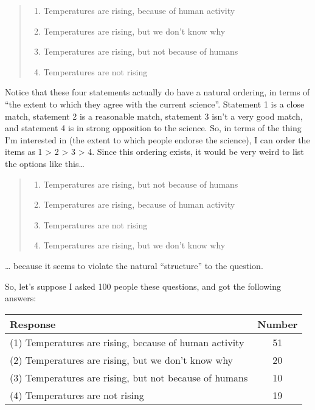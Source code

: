 \documentclass[]{book}
\providecommand{\tightlist}{%
  \setlength{\itemsep}{0pt}\setlength{\parskip}{0pt}}
\begin{document}
\begin{quote}
\begin{enumerate}
\def\labelenumi{(\arabic{enumi})}
\tightlist
\item
  Temperatures are rising, because of human activity
\item
  Temperatures are rising, but we don't know why
\item
  Temperatures are rising, but not because of humans
\item
  Temperatures are not rising
\end{enumerate}
\end{quote}

Notice that these four statements actually do have a natural ordering, in terms of ``the extent to which they agree with the current science''. Statement 1 is a close match, statement 2 is a reasonable match, statement 3 isn't a very good match, and statement 4 is in strong opposition to the science. So, in terms of the thing I'm interested in (the extent to which people endorse the science), I can order the items as 1 \textgreater{} 2 \textgreater{} 3 \textgreater{} 4. Since this ordering exists, it would be very weird to list the options like this\ldots{}

\begin{quote}
\begin{enumerate}
\def\labelenumi{(\arabic{enumi})}
\setcounter{enumi}{2}
\tightlist
\item
  Temperatures are rising, but not because of humans
\item
  Temperatures are rising, because of human activity
\item
  Temperatures are not rising
\item
  Temperatures are rising, but we don't know why
\end{enumerate}
\end{quote}

\ldots{} because it seems to violate the natural ``structure'' to the question.

So, let's suppose I asked 100 people these questions, and got the following answers:

\begin{longtable}[]{@{}lc@{}}
\toprule
Response & Number\tabularnewline
\midrule
\endhead
(1) Temperatures are rising, because of human activity & 51\tabularnewline
(2) Temperatures are rising, but we don't know why & 20\tabularnewline
(3) Temperatures are rising, but not because of humans & 10\tabularnewline
(4) Temperatures are not rising & 19\tabularnewline
\bottomrule
\end{longtable}
\end{document}
